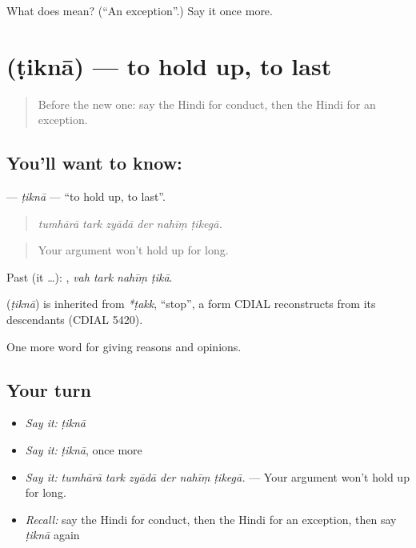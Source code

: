 \begin{tcolorbox}[breakable,colback=teal!4,colframe=teal!35!black,title={Before you move on}]
What does  mean? (\textquotedblleft{}An exception\textquotedblright{}.) Say it once more.
\end{tcolorbox}
\section[\texorpdfstring{\hi{टिकना} (ṭiknā)}{टिकना (ṭiknā)}]{ (ṭiknā) — to hold up, to last}

\label{lesson:HI-C365-tikna}



\begin{quote}
Before the new one: say the Hindi for conduct, then the Hindi for an exception.
\end{quote}

\subsection*{You'll want to know: }
\textbf{} — \emph{ṭiknā} — \textquotedblleft{}to hold up, to last\textquotedblright{}.

\begin{quote}
     
\end{quote}

\begin{quote}
\emph{tumhārā tark zyādā der nahīṃ ṭikegā.}
\end{quote}

\begin{quote}
Your argument won't hold up for long.
\end{quote}

Past (it …):    , \emph{vah tark nahīṃ ṭikā}.

\begin{cousinweb}
\textbf{} (\emph{ṭiknā}) is inherited from \emph{*ṭakk}, \textquotedblleft{}stop\textquotedblright{}, a form CDIAL reconstructs from its descendants (CDIAL 5420).
\end{cousinweb}

\begin{grammarlens}[title={What you've built}]
One more word for giving reasons and opinions.
\end{grammarlens}

\subsection*{Your turn}
\begin{itemize}
\raggedright
  \item \emph{Say it:} \emph{ṭiknā}
  \item \emph{Say it:} \emph{ṭiknā}, once more
  \item \emph{Say it:} \emph{tumhārā tark zyādā der nahīṃ ṭikegā.} — Your argument won't hold up for long.
  \item \emph{Recall:} say the Hindi for conduct, then the Hindi for an exception, then say \emph{ṭiknā} again
\end{itemize}

